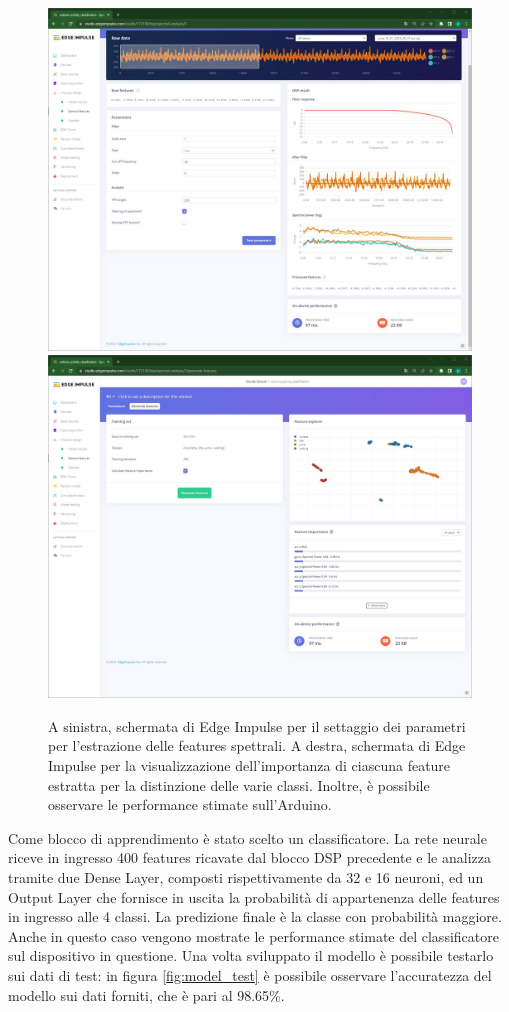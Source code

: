 \begin{figure}[t!]
	\centering
	\includegraphics[width=0.49\linewidth]{./ImageFiles/spectral_features.jpg}
	\includegraphics[width=0.49\linewidth]{./ImageFiles/features_extracted.jpg}
	\caption{A sinistra, schermata di Edge Impulse per il settaggio dei parametri per l'estrazione delle features spettrali. A destra, schermata di Edge Impulse per la visualizzazione dell'importanza di ciascuna feature estratta per la distinzione delle varie classi. Inoltre, è possibile osservare le performance stimate sull'Arduino.}
	\label{fig:spectral_feature}
\end{figure}
Come blocco di apprendimento è stato scelto un classificatore. La rete neurale riceve in ingresso 400 features ricavate dal blocco DSP precedente e le analizza tramite due Dense Layer, composti rispettivamente da 32 e 16 neuroni, ed un Output Layer che fornisce in uscita la probabilità di appartenenza delle features in ingresso alle 4 classi. La predizione finale è la classe con probabilità maggiore. Anche in questo caso vengono mostrate le performance stimate del classificatore sul dispositivo in questione.
Una volta sviluppato il modello è possibile testarlo sui dati di test: in figura \ref{fig:model_test} è possibile osservare l'accuratezza del modello sui dati forniti, che è pari al 98.65\%. 
